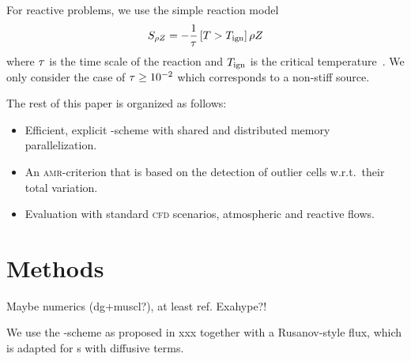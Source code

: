 \documentclass[runningheads]{llncs}
\begin{document}
For reactive problems, we use the simple reaction model
\begin{equation}
  \label{eq:reaction-model}
  \source[\QZ] = - \frac{1}{\reactionTimescale} \left[T > \reactionTemperature \right]\QZ
\end{equation}
where $\tau$ is the time scale of the reaction and $T_{\text{ign}}$ is the critical temperature~\cite{hidalgo2011ader,helzel2000modified}.
We only consider the case of $\tau \geq 10^{-2}$ which corresponds to a non-stiff source.

The rest of this paper is organized as follows:
\begin{itemize}
\item Efficient, explicit \aderdg{}-scheme with shared and distributed memory parallelization.
\item An \textsc{amr}-criterion that is based on the detection of outlier cells w.r.t.\ their total variation.
\item Evaluation with standard \textsc{cfd} scenarios, atmospheric and reactive flows.
\end{itemize}

\section{Methods}
Maybe numerics (dg+muscl?), at least ref.
Exahype?!

We use the \aderdg{}-scheme as proposed in xxx together with a Rusanov-style flux, which is adapted for \pde{}s with diffusive terms. 
\end{document}
